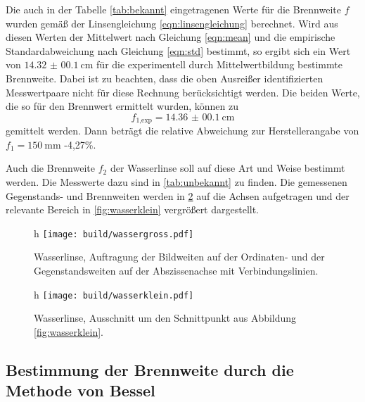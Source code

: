 Die auch in der Tabelle \ref{tab:bekannt} eingetragenen Werte für die Brennweite $f$ wurden gemäß der
Linsengleichung \eqref{eqn:linsengleichung} berechnet. Wird aus diesen Werten
der Mittelwert nach Gleichung \eqref{eqn:mean} und die empirische Standardabweichung
nach Gleichung \eqref{eqn:std} bestimmt, so ergibt sich ein Wert von $\SI{14.32(0010)}{\centi\meter}$
für die experimentell durch Mittelwertbildung bestimmte Brennweite. Dabei ist zu
beachten, dass die oben Ausreißer identifizierten Messwertpaare nicht für diese Rechnung
berücksichtigt werden. Die beiden Werte, die so für den Brennwert ermittelt wurden,
können zu
\begin{equation*}
  f_{\text{1,exp}} = \SI{14.36(0010)}{\centi\meter}
\end{equation*}
gemittelt werden. Dann beträgt die relative Abweichung zur Herstellerangabe von
$f_1 = \SI{150}{\milli\meter}$ -4,27\%.

Auch die Brennweite $f_2$ der Wasserlinse soll auf diese Art und Weise bestimmt werden.
Die Messwerte dazu sind in \ref{tab:unbekannt} zu finden.
Die gemessenen Gegenstands- und Brennweiten werden in \ref{fig:wassergross} auf die Achsen aufgetragen
und der relevante Bereich in \ref{fig:wasserklein} vergrößert dargestellt.

\begin{figure}{h}
  \centering
  \texttt{[image: build/wassergross.pdf]}
  \caption{Wasserlinse, Auftragung der Bildweiten auf der Ordinaten- und der Gegenstandsweiten auf der Abszissenachse mit Verbindungslinien.}
  \label{fig:wassergross}
\end{figure}

\begin{figure}{h}
  \centering
  \texttt{[image: build/wasserklein.pdf]}
  \caption{Wasserlinse, Ausschnitt um den Schnittpunkt aus Abbildung \ref{fig:wasserklein}.}
  \label{fig:wassergross}
\end{figure}

\subsection{Bestimmung der Brennweite durch die Methode von Bessel}
